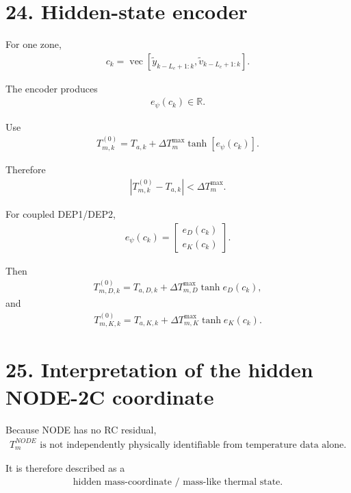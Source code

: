 \documentclass[11pt]{article}
\begin{document}
\section*{24. Hidden-state encoder}

For one zone,
\begin{align}
\boxed{
c_k
=
\operatorname{vec}
\left[
\widetilde y_{k-L_e+1:k},
\widetilde v_{k-L_e+1:k}
\right].
}
\tag{N3.80}
\end{align}

The encoder produces
\begin{align}
\boxed{e_\psi(c_k)\in\mathbb R.}
\tag{N3.81}
\end{align}

Use
\begin{align}
\boxed{
T_{m,k}^{(0)}
=
T_{a,k}
+
\Delta T_m^{\max}
\tanh[e_\psi(c_k)].
}
\tag{N3.82}
\end{align}

Therefore
\begin{align}
\boxed{
|T_{m,k}^{(0)}-T_{a,k}|
<
\Delta T_m^{\max}.
}
\tag{N3.83}
\end{align}

For coupled DEP1/DEP2,
\begin{align}
\boxed{
e_\psi(c_k)=
\begin{bmatrix}
e_D(c_k)\\
e_K(c_k)
\end{bmatrix}.
}
\tag{N3.84}
\end{align}

Then
\begin{align}
\boxed{
T_{m,D,k}^{(0)}
=
T_{a,D,k}
+
\Delta T_{m,D}^{\max}\tanh e_D(c_k),
}
\tag{N3.85}
\end{align}
and
\begin{align}
\boxed{
T_{m,K,k}^{(0)}
=
T_{a,K,k}
+
\Delta T_{m,K}^{\max}\tanh e_K(c_k).
}
\tag{N3.86}
\end{align}

\section*{25. Interpretation of the hidden NODE-2C coordinate}

Because NODE has no RC residual,
\begin{align}
\boxed{
T_m^{NODE}
\text{ is not independently physically identifiable from temperature data alone.}
}
\tag{N3.87}
\end{align}

It is therefore described as a
\begin{align}
\boxed{\text{hidden mass-coordinate / mass-like thermal state}.}
\tag{N3.88}
\end{align}
\end{document}

